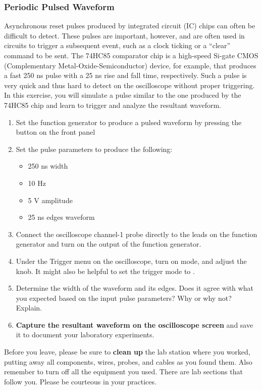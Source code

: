 \documentclass[12pt]{../manual}
\begin{document}
\subsubsection{Periodic Pulsed Waveform}
Asynchronous reset pulses produced by integrated circuit (IC) chips can often be difficult to detect.  These pulses are important, however, and are often used in circuits to trigger a subsequent event, such as a clock ticking or a ``clear'' command to be sent.  The 74HC85 comparator chip is a high-speed Si-gate CMOS (Complementary Metal-Oxide-Semiconductor) device, for example, that produces a fast 250 ns pulse with a 25 ns rise and fall time, respectively.   Such a pulse is very quick and thus hard to detect on the oscilloscope without proper triggering.  In this exercise, you will simulate a pulse similar to the one produced by the 74HC85 chip and learn to trigger and analyze the resultant waveform.

\begin{enumerate}
\item Set the function generator to produce a pulsed waveform by pressing the  button on the front panel
\item Set the pulse parameters to produce the following: 
\begin{itemize}
\item 250 ns width
\item 10 Hz
\item 5 V amplitude
\item 25 ns edges waveform
\end{itemize}
\item Connect the oscilloscope channel-1 probe directly to the leads on the function generator and turn on the output of the function generator.
\item Under the Trigger menu on the oscilloscope, turn on  mode, and adjust the  knob. It might also be helpful to set the trigger mode to  . 
\item Determine the width of the waveform and its edges. Does it agree with what you expected based on the input pulse parameters? Why or why not? Explain.
\item \textbf{Capture the resultant waveform on the oscilloscope screen} and save it to document your laboratory experiments.
\end{enumerate}

Before you leave, please be sure to \textbf{clean up} the lab station where you worked, putting away all components, wires, probes, and cables as you found them. Also remember to turn off all the equipment you used. There are lab sections that follow you. Please be courteous in your practices.
\end{document}
